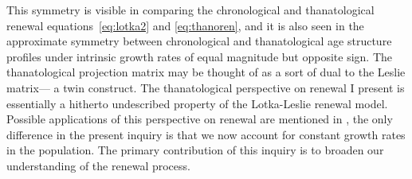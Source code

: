 \documentclass{article}
\begin{document}
This symmetry is visible in comparing the
chronological and thanatological renewal equations~\eqref{eq:lotka2}
and \eqref{eq:thanoren}, and it is also seen in the approximate symmetry between
chronological and thanatological age structure profiles under intrinsic growth
rates of equal magnitude but opposite sign. The thanatological projection matrix may be thought of as a
sort of dual to the Leslie matrix--- a twin construct. The thanatological perspective on renewal I present is
essentially a hitherto undescribed property of the Lotka-Leslie renewal model. Possible applications of
this perspective on renewal are mentioned in \citet{riffe2015force}, the only
difference in the present inquiry is that we now account for constant growth rates in the
population. The primary contribution of this inquiry is to broaden our
understanding of the renewal process.

\vspace{2em}
\end{document}
